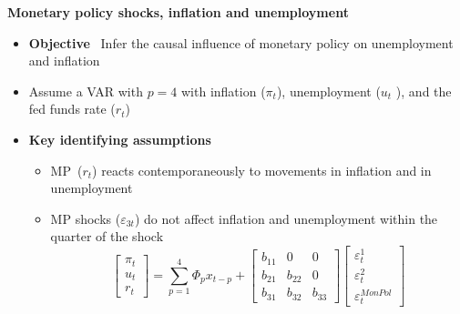 \begin{frame}
{\textbf{Monetary policy shocks, inflation and unemployment}}\bigskip\bigskip

\begin{itemize}
\item \textbf{Objective} \ Infer the causal influence of monetary policy on
unemployment and inflation\bigskip\pause

\item Assume a VAR with $p=4$ with inflation ($\pi_t$), unemployment ($u_t$%
), and the fed funds rate ($r_t$)\bigskip

\item \textbf{Key identifying assumptions}\smallskip

\begin{itemize}
\item MP\ ($r_{t}$) reacts contemporaneously to movements in inflation and
in unemployment\medskip

\item MP shocks ($\varepsilon_{3t}$) do not affect inflation and
unemployment within the quarter of the shock\smallskip \pause%
\begin{equation*}
\begin{bmatrix}
\pi _{t} \\ 
u_{t} \\ 
r_{t}%
\end{bmatrix}%
=\sum_{p=1}^4 \Phi_p x_{t-p} +\left[ 
\begin{array}{ccc}
b_{11} & 0 & 0 \\ 
b_{21} & b_{22} & 0 \\ 
b_{31} & b_{32} & b_{33}%
\end{array}%
\right] 
\begin{bmatrix}
\varepsilon^{1}_{t} \\ 
\varepsilon^{2}_{t} \\ 
\varepsilon^{MonPol}_{t}%
\end{bmatrix}%
\end{equation*}
\end{itemize}
\end{itemize}
\end{frame}


